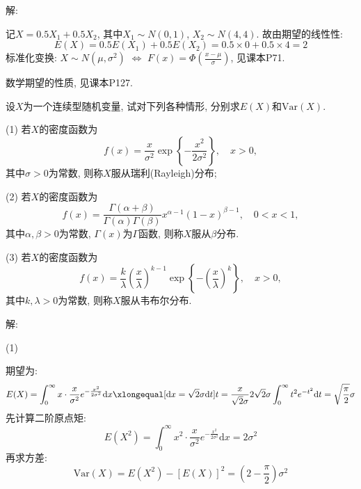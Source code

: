 \documentclass[standard]{ExBook}
\begin{document}
\begin{qitems}
\vspace{-5em}

    \begin{bbox}
解: 

记$X=0.5 X_{1}+0.5 X_{2}$, 其中$X_{1}\sim N(0,1)$, $X_{2}\sim N(4,4)$. 故由期望的线性性:
$$E(X)=0.5 E(X_{1})+0.5 E(X_{2})=0.5\times0+0.5\times4=2$$
\textcolor{themeColor}{\selectfont {}
标准化变换: $X\sim N(\mu,\sigma^2)$ $\Longleftrightarrow$ $F(x)=\Phi(\frac{x-\mu}{\sigma})$, 见课本P71.}

\textcolor{themeColor}{\selectfont {}
数学期望的性质, 见课本P127.}
    \end{bbox}

\vspace{-5em}

    \begin{bbox}
    \begin{shaded}
        \qitem
设$X$为一个连续型随机变量, 试对下列各种情形, 分别求$E ( X ) $和$\mathrm{Var}(X)$.

(1) 若$X$的密度函数为
$$f(x)=\displaystyle\frac{x}{\sigma^2}\exp\left\{-\frac{x^2}{2\sigma^2}\right\},\quad x>0,$$
其中$\sigma>0$为常数, 则称$X$服从瑞利(Rayleigh)分布;

(2) 若$X$的密度函数为
$$f(x)=\displaystyle\frac{\Gamma(\alpha+\beta)}{\Gamma(\alpha)\Gamma(\beta)}x^{\alpha-1}(1-x)^{\beta-1},\quad 0<x<1,$$
其中$\alpha,\beta>0$为常数, $\Gamma(x)$为$\Gamma$函数, 则称$X$服从$\beta$分布.

(3) 若$X$的密度函数为
$$f(x)=\displaystyle\frac{k}{\lambda}\left(\frac{x}{\lambda}\right)^{k-1}\exp \left\{-\left(\frac{x}{\lambda}\right)^{k}\right\},\quad x>0,$$
其中$k, \lambda>0$为常数, 则称$X$服从韦布尔分布.
    \end{shaded}
    \end{bbox}

\vspace{-5em}

    \begin{bbox}
解: 

(1)

期望为:
$$\displaystyle E(X)=\int_{0}^{\infty}x\cdot \frac{x}{\sigma^2}e^{-\frac{x^2}{2\sigma^2}}\mathrm{d}x\xlongequal[\mathrm{d}x=\sqrt{2}\sigma\mathrm{d}t]{t=\frac{x}{\sqrt{2}\sigma}}2\sqrt{2}\sigma\int_{0}^{\infty}t^2 e^{-t^2}\mathrm{d}t=\sqrt{\frac{\pi}{2}}\sigma$$
先计算二阶原点矩:
$$E(X^2)=\int_{0}^{\infty}x^2\cdot \frac{x}{\sigma^2}e^{-\frac{x^2}{2\sigma^2}}\mathrm{d}x=2\sigma^2$$
再求方差:
$$\mathrm{Var}(X)=E(X^2)-\left[E(X)\right]^2=\left(2-\frac{\pi}{2}\right)\sigma^2$$
    \end{bbox}


\end{qitems}
\end{document}

